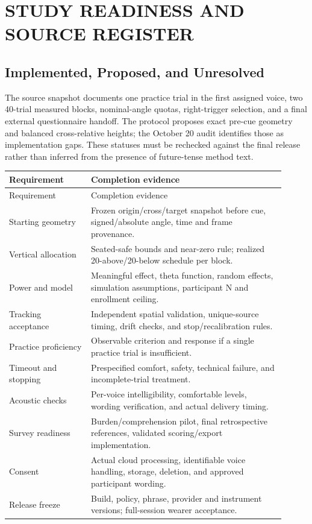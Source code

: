 \chapter{STUDY READINESS AND SOURCE REGISTER}
\label{app:readiness}
\newpage
\section{Implemented, Proposed, and Unresolved}
The source snapshot documents one practice trial in the first assigned voice, two 40-trial measured blocks, nominal-angle quotas, right-trigger selection, and a final external questionnaire handoff. The protocol proposes exact pre-cue geometry and balanced cross-relative heights; the October 20 audit identifies those as implementation gaps. These statuses must be rechecked against the final release rather than inferred from the presence of future-tense method text.

\begingroup
{}
\begin{longtable}{@{}p{0.27\linewidth}p{0.64\linewidth}@{}}
\toprule
Requirement & Completion evidence \\\midrule\endfirsthead
\toprule Requirement & Completion evidence \\\midrule\endhead
Starting geometry & Frozen origin/cross/target snapshot before cue, signed/absolute angle, time and frame provenance.\\
Vertical allocation & Seated-safe bounds and near-zero rule; realized 20-above/20-below schedule per block.\\
Power and model & Meaningful effect, theta function, random effects, simulation assumptions, participant N and enrollment ceiling.\\
Tracking acceptance & Independent spatial validation, unique-source timing, drift checks, and stop/recalibration rules.\\
Practice proficiency & Observable criterion and response if a single practice trial is insufficient.\\
Timeout and stopping & Prespecified comfort, safety, technical failure, and incomplete-trial treatment.\\
Acoustic checks & Per-voice intelligibility, comfortable levels, wording verification, and actual delivery timing.\\
Survey readiness & Burden/comprehension pilot, final retrospective references, validated scoring/export implementation.\\
Consent & Actual cloud processing, identifiable voice handling, storage, deletion, and approved participant wording.\\
Release freeze & Build, policy, phrase, provider and instrument versions; full-session wearer acceptance.\\\bottomrule
\end{longtable}
\endgroup

